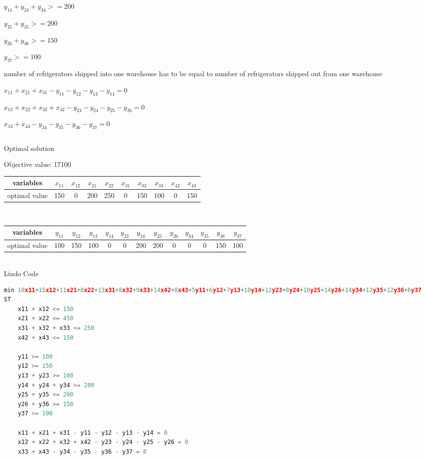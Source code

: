 \documentclass[11pt]{scrreprt}
\begin{document}
$y_{14} + y_{24} + y_{34} >= 200$

$y_{25} + y_{35} >= 200$

$y_{26} + y_{36} >= 150$

$y_{37} >= 100$

number of refrigerators shipped into one warehouse has to be equal to number of refrigerators shipped out from one warehouse

$x_{11} + x_{21} + x_{31} - y_{11} - y_{12} - y_{13} - y_{14} = 0$

$x_{12} + x_{22} + x_{32} + x_{42} - y_{23} - y_{24} - y_{25} - y_{26} = 0$

$x_{33} + x_{43} - y_{34} - y_{35} - y_{36} - y_{37} = 0$



\subsection{}
Optimal solution

Objective value: 17100  \\

\begin{tabular}{|c|c|c|c|c|c|c|c|c|c|}
	\hline variables & $x_{11}$   &  $x_{12}$ & $x_{21}$ & $x_{22}$ & $x_{31}$ & $x_{32}$ & $x_{33}$ & $x_{42}$ & $x_{43}$      \\
	\hline optimal value & 150  &  0 & 200 & 250 & 0 & 150 & 100 & 0 & 150            \\
	\hline
\end{tabular} \\

\begin{tabular}{|c|c|c|c|c|c|c|c|c|c|c|c|c|}
	\hline variables & $y_{11}$ & $y_{12}$ & $y_{13}$ & $y_{14}$ & $y_{23}$ & $y_{24}$ & $y_{25}$ & $y_{26}$ & $y_{34}$ & $y_{35}$ & $y_{36}$ & $y_{37}$  \\
	\hline optimal value & 	100 & 150 & 100 & 0 & 0 & 200 & 200 & 0 & 0 & 0 & 150 & 100 \\
	 \hline
\end{tabular} \\

Lindo Code

\begin{lstlisting}[language=c]
min 10x11+15x12+11x21+8x22+13x31+8x32+9x33+14x42+8x43+5y11+6y12+7y13+10y14+12y23+8y24+10y25+14y26+14y34+12y35+12y36+6y37
ST
	x11 + x12 <= 150
	x21 + x22 <= 450
	x31 + x32 + x33 <= 250
	x42 + x43 <= 150

	y11 >= 100
	y12 >= 150
	y13 + y23 >= 100
	y14 + y24 + y34 >= 200
	y25 + y35 >= 200
	y26 + y36 >= 150
	y37 >= 100

	x11 + x21 + x31 - y11 - y12 - y13 - y14 = 0
	x12 + x22 + x32 + x42 - y23 - y24 - y25 - y26 = 0
	x33 + x43 - y34 - y35 - y36 - y37 = 0
\end{lstlisting}
\end{document}
